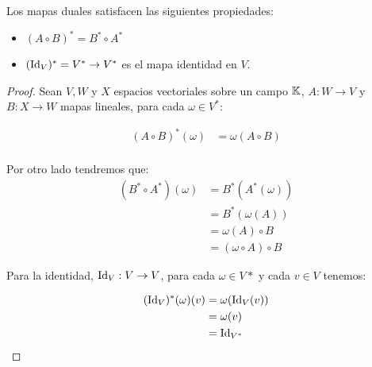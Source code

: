 \begin{lemma}
Los mapas duales satisfacen las siguientes propiedades:
  \begin{itemize}
    \item $(A \circ B)^{*} = B^{*} \circ A^{*}$\\
    \item $(\mathrm{Id}_V)^{*} = V^{*} \to V^{*}$ es el mapa identidad en $V$.
  \end{itemize}
\end{lemma}

\begin{proof}
  Sean $V,W$ y $X$ espacios vectoriales sobre un campo $\mathbb{K}$, $A: W \to V$ y $B: X \to W$ mapas lineales, para cada $\omega \in V^{*}$:
  
\begin{align*}
  (A\circ B)^{*}(\omega) &= \omega(A \circ B)\\
\end{align*}

Por otro lado tendremos que:
  \begin{align*}
    (B^* \circ A^*)(\omega) &= B^{*}(A^*(\omega)) \\
    &= B^{*}(\omega(A)) \\
    &= \omega(A) \circ B\\
    &= (\omega \circ A) \circ B
  \end{align*}

  Para la identidad, $\mathrm{Id}_V: V \to V$, para cada $\omega \in V*$ y cada $v \in V$ tenemos:

  \begin{align*}
    (\mathrm{Id}_V)^{*}(\omega)(v) &= \omega(\mathrm{Id}_V(v))\\
    &= \omega(v)\\
    &= \mathrm{Id}_{V^{*}}
  \end{align*}
\end{proof}

